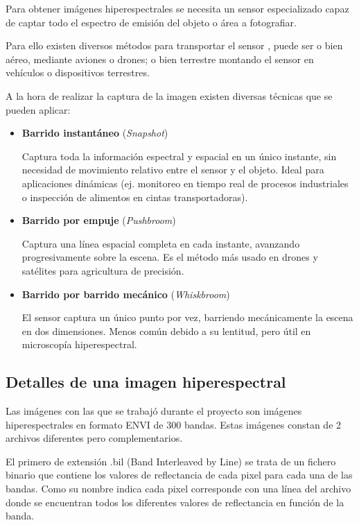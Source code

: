 Para obtener imágenes hiperespectrales se necesita un sensor especializado capaz de captar todo el espectro de emisión del objeto o área a fotografiar.

Para ello existen diversos métodos para transportar el sensor\cite{Prez2018ComputacinDA} , puede ser o bien aéreo, mediante aviones o drones; o bien terrestre montando el sensor en vehículos o dispositivos terrestres.

A la hora de realizar la captura de la imagen existen diversas técnicas que se pueden aplicar:

\begin{itemize}
\item \textbf{Barrido instantáneo} (\textit{Snapshot})

Captura toda la información espectral y espacial en un único instante, sin necesidad de movimiento relativo entre el sensor y el objeto. Ideal para aplicaciones dinámicas (ej. monitoreo en tiempo real de procesos industriales o inspección de alimentos en cintas transportadoras).

\item \textbf{Barrido por empuje} (\textit{Pushbroom})

Captura una línea espacial completa en cada instante, avanzando progresivamente sobre la escena. Es el método más usado en drones y satélites para agricultura de precisión.

\item \textbf{Barrido por barrido mecánico} (\textit{Whiskbroom})

El sensor captura un único punto por vez, barriendo mecánicamente la escena en dos dimensiones. Menos común debido a su lentitud, pero útil en microscopía hiperespectral.

\end{itemize}

\subsection{Detalles de una imagen hiperespectral}
Las imágenes con las que se trabajó durante el proyecto son imágenes hiperespectrales en formato ENVI de 300 bandas. Estas imágenes constan de 2 archivos diferentes pero complementarios.

El primero de extensión .bil (Band Interleaved by Line) se trata de un fichero binario que contiene los valores de reflectancia de cada pixel para cada una de las bandas. Como su nombre indica cada pixel corresponde con una línea del archivo donde se encuentran todos los diferentes valores de reflectancia en función de la banda.

